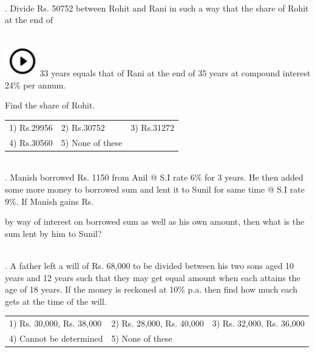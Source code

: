 \documentclass{article}
\begin{document}
	\noindent  \\ 
	
	. Divide Rs. 50752 between Rohit and Rani in such a way that the share of Rohit at the end of
	
	\noindent  
	 
	\noindent \\ \includegraphics*[width=0.60in, height=0.52in]{images/image1}33 years equals that of Rani at the end of 35 years at compound interest 24\% per annum.
	
	\noindent Find the share of Rohit.
	
	\noindent 
	
	\noindent \begin{tabular}{p{1.7in} p{1.6in} p{1.6in}} \\ 
 1) Rs.29956             & 2) Rs.30752      & 3) Rs.31272      \\
4) Rs.30560     & 5) None of these  \\
\end{tabular}
	
	\noindent 
	
	\noindent 
	
	\noindent  \\ 
	
	. Manish borrowed Rs. 1150 from Anil @ S.I rate 6\% for 3 years. He then added some more money to borrowed sum and lent it to Sunil for same time @ S.I rate 9\%. If Manish gains Rs.
	
	 by way of interest on borrowed sum as well as his own amount, then what is the sum lent by him to Sunil?
	
	\noindent 
	
	\noindent  \\ 
	
	. A father left a will of Rs. 68,000 to be divided between his two sons aged 10 years and 12 years such that they may get equal amount when each attains the age of 18 years. If the money is reckoned at 10\% p.a. then find how much each gets at the time of the will.
	
	\noindent \begin{tabular}{p{1.7in} p{1.6in} p{1.6in}} \\ 
 1) Rs. 30,000, Rs. 38,000                 & 2) Rs. 28,000, Rs. 40,000
	
	\noindent 
	
	\noindent & 3) Rs. 32,000, Rs. 36,000                 \\
4) Cannot be determined
	
	\noindent 
	
	\noindent & 5)   None of these \\
\end{tabular}
	
\end{document}
